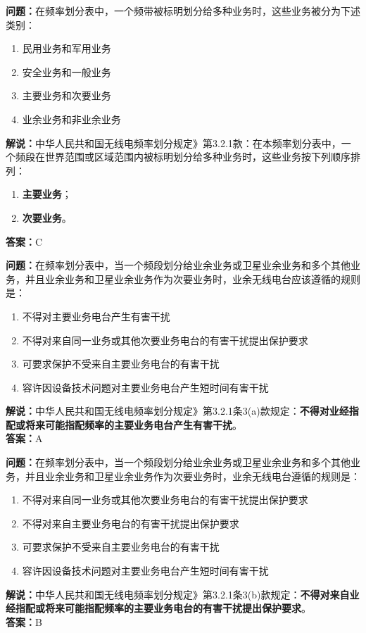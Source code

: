 \bigskip


\noindent\textbf{问题：}在频率划分表中，一个频带被标明划分给多种业务时，这些业务被分为下述类别：
\begin{enumerate}[label=\Alph*), leftmargin=3em]
\item 民用业务和军用业务
\item 安全业务和一般业务
\item 主要业务和次要业务
\item 业余业务和非业余业务
\end{enumerate}
\noindent\textbf{解说：}中华人民共和国无线电频率划分规定》第3.2.1款：在本频率划分表中，一个频段在世界范围或区域范围内被标明划分给多种业务时，这些业务按下列顺序排列：
\begin{enumerate}[label=\alph*), leftmargin=3em]
\item \textbf{主要业务}；
\item \textbf{次要业务}。
\end{enumerate}
\textbf{答案：}C



\bigskip


\noindent\textbf{问题：}在频率划分表中，当一个频段划分给业余业务或卫星业余业务和多个其他业务，并且业余业务和卫星业余业务作为次要业务时，业余无线电台应该遵循的规则是：
\begin{enumerate}[label=\Alph*), leftmargin=3em]
\item 不得对主要业务电台产生有害干扰
\item 不得对来自同一业务或其他次要业务电台的有害干扰提出保护要求
\item 可要求保护不受来自主要业务电台的有害干扰
\item 容许因设备技术问题对主要业务电台产生短时间有害干扰
\end{enumerate}
\noindent\textbf{解说：}中华人民共和国无线电频率划分规定》第3.2.1条3(a)款规定：\textbf{不得对业经指配或将来可能指配频率的主要业务电台产生有害干扰}。\\
\textbf{答案：}A


\bigskip


\noindent\textbf{问题：}在频率划分表中，当一个频段划分给业余业务或卫星业余业务和多个其他业务，并且业余业务和卫星业余业务作为次要业务时，业余无线电台遵循的规则是：
\begin{enumerate}[label=\Alph*), leftmargin=3em]
\item 不得对来自同一业务或其他次要业务电台的有害干扰提出保护要求
\item 不得对来自主要业务电台的有害干扰提出保护要求
\item 可要求保护不受来自主要业务电台的有害干扰
\item 容许因设备技术问题对主要业务电台产生短时间有害干扰
\end{enumerate}
\noindent\textbf{解说：}中华人民共和国无线电频率划分规定》第3.2.1条3(b)款规定：\textbf{不得对来自业经指配或将来可能指配频率的主要业务电台的有害干扰提出保护要求}。\\\textbf{答案：}B



